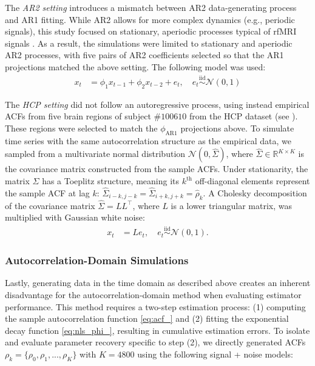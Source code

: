 \documentclass[latex/main.tex]{subfiles}
\begin{document}
The \textit{AR2 setting} introduces a mismatch between AR2 data-generating process and AR1 fitting. While AR2 allows for more complex dynamics (e.g., periodic signals), this study focused on stationary, aperiodic processes typical of rfMRI signals \citep{he_scale-free_2011}. As a result, the simulations were limited to stationary and aperiodic AR2 processes, with five pairs of AR2 coefficients selected so that the AR1 projections matched the above setting. The following model was used:
\begin{align}
    x_t &= \phi_1 x_{t-1} + \phi_2 x_{t-2} + e_t, \quad e_t \overset{\text{iid}}{\sim} \mathcal{N}(0, 1)
\end{align}

The \textit{HCP setting} did not follow an autoregressive process, using instead empirical ACFs from five brain regions of subject $\#100610$ from the HCP dataset (see ). These regions were selected to match the $\phi_\text{AR1}$ projections above. To simulate time series with the same autocorrelation structure as the empirical data, we sampled from a multivariate normal distribution $\mathcal{N}(0, \hat\Sigma)$, where $\hat\Sigma \in \mathbb{R}^{K\times K}$ is the covariance matrix constructed from the sample ACFs. Under stationarity, the matrix $\hat\Sigma$ has a Toeplitz structure, meaning its $k^\text{th}$ off-diagonal elements represent the sample ACF at lag $k$: $\hat\Sigma_{i-k, j-k} = \hat\Sigma_{i+k, j+k} = \hat\rho_k$. A Cholesky decomposition of the covariance matrix $\hat\Sigma = LL^{\top}$, where $L$ is a lower triangular matrix, was multiplied with Gaussian white noise:
\begin{align}
    x_t &= L e_t, \quad e_t \overset{\text{iid}}{\sim} \mathcal{N}(0, 1).
\end{align}

\subsubsection{Autocorrelation-Domain Simulations}
Lastly, generating data in the time domain as described above creates an inherent disadvantage for the autocorrelation-domain method when evaluating estimator performance. This method requires a two-step estimation process: (1) computing the sample autocorrelation function \eqref{eq:acf_} and (2) fitting the exponential decay function \eqref{eq:nls_phi_}, resulting in cumulative estimation errors. To isolate and evaluate parameter recovery specific to step (2), we directly generated ACFs $\rho_k = \{\rho_0, \rho_1, ..., \rho_K\}$ with $K=4800$ using the following signal + noise models:
\end{document}
